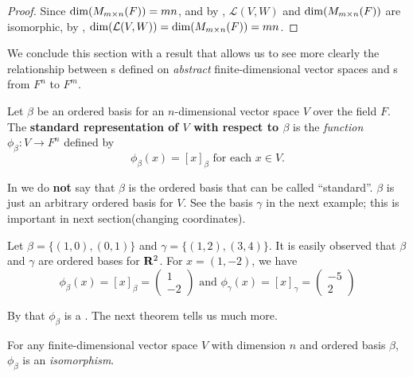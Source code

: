 \begin{proof}
Since \(\dim(M_{m \times n}(F)) = mn\), and by , \(\mathcal{L}(V, W)\) and \(\dim(M_{m \times n}(F))\) are isomorphic, by , \(\dim(\mathcal{L}(V, W)) = \dim(M_{m \times n}(F)) = mn\).
\end{proof}

We conclude this section with a result that allows us to see more clearly the relationship between \LTRAN{}s defined on \emph{abstract} finite-dimensional vector spaces and \LTRAN{}s from \(F^n\) to \(F^m\).

\begin{definition} \label{def 2.15}
Let \(\beta\) be an ordered basis for an \(n\)-dimensional vector space \(V\) over the field \(F\).
The \textbf{standard representation of \(V\) with respect to \(\beta\)} is the \emph{function} \(\phi_{\beta} : V \to F^n\) defined by
\[
    \phi_{\beta}(x) = [x]_{\beta} \text{ for each } x \in V.
\]
\end{definition}

\begin{note}
In  we do \textbf{not} say that \(\beta\) is the ordered basis that can be called ``standard''.
\(\beta\) is just an arbitrary ordered basis for \(V\).
See the basis \(\gamma\) in the next example; this is important in next section(changing coordinates).
\end{note}

\begin{example} \label{example 2.4.6}
Let \(\beta = \{ (1, 0), (0, 1) \}\) and \(\gamma = \{ (1, 2), (3, 4) \}\).
It is easily observed that \(\beta\) and \(\gamma\) are ordered bases for \(\mathbf{R}^2\).
For \(x = (1, -2)\), we have
\[
    \phi_{\beta}(x) = [x]_{\beta} = \begin{pmatrix} 1 \\ -2 \end{pmatrix}
    \text{ and }
    \phi_{\gamma}(x) = [x]_{\gamma} = \begin{pmatrix} -5 \\ 2 \end{pmatrix}
\]
\end{example}

By  that \(\phi_{\beta}\) is a \LTRAN{}.
The next theorem tells us much more.

\begin{theorem} \label{thm 2.21}
For any finite-dimensional vector space \(V\) with dimension \(n\) and ordered basis \(\beta\), \(\phi_{\beta}\) is an \emph{isomorphism}.
\end{theorem}

